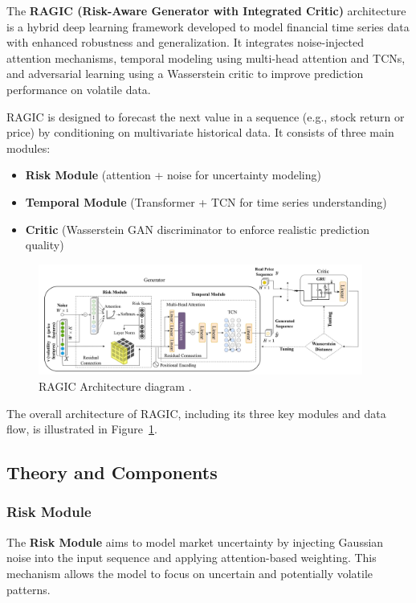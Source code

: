 The \textbf{RAGIC (Risk-Aware Generator with Integrated Critic)} architecture is a hybrid deep learning framework developed to model financial time series data with enhanced robustness and generalization. It integrates noise-injected attention mechanisms, temporal modeling using multi-head attention and TCNs, and adversarial learning using a Wasserstein critic to improve prediction performance on volatile data.

RAGIC is designed to forecast the next value in a sequence (e.g., stock return or price) by conditioning on multivariate historical data. It consists of three main modules:
\begin{itemize}
    \item \textbf{Risk Module} (attention + noise for uncertainty modeling)
    \item \textbf{Temporal Module} (Transformer + TCN for time series understanding)
    \item \textbf{Critic} (Wasserstein GAN discriminator to enforce realistic prediction quality)
\end{itemize}

\begin{figure}[H]
    \centering
    \includegraphics[width=0.95\textwidth]{Images/Screenshot 2025-05-19 at 15.00.48.png}
    \caption{RAGIC Architecture diagram \cite{gu_ragic_2025}.}
    \label{fig:ragic_architecture}
\end{figure}
The overall architecture of RAGIC, including its three key modules and data flow, is illustrated in Figure~\ref{fig:ragic_architecture}.

\subsection{Theory and Components}

\subsubsection{Risk Module}

The \textbf{Risk Module} aims to model market uncertainty by injecting Gaussian noise into the input sequence and applying attention-based weighting. This mechanism allows the model to focus on uncertain and potentially volatile patterns.

